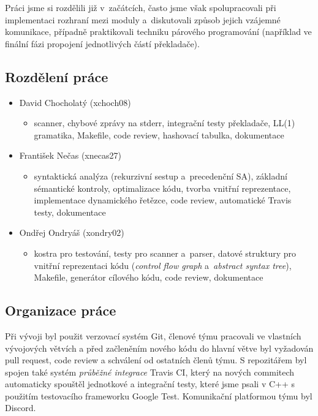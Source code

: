\documentclass[11pt]{article}
\begin{document}
Práci jsme si rozdělili již v~začátcích, často jsme však spolupracovali při implementaci rozhraní mezi moduly a~diskutovali způsob jejich vzájemné komunikace, případně praktikovali techniku párového programování (například ve finální fázi propojení jednotlivých částí překladače).

\subsection{Rozdělení práce}

\begin{itemize}
	\item David Chocholatý (xchoch08)
	    \begin{itemize}
	        \item scanner, chybové zprávy na stderr, integrační testy překladače, LL(1) gramatika, Makefile, code review, hashovací tabulka, dokumentace
	    \end{itemize}
	\item František Nečas (xnecas27) 
	    \begin{itemize}
	        \item syntaktická analýza (rekurzivní sestup a~precedenční SA), základní sémantické kontroly, optimalizace kódu, tvorba vnitřní reprezentace, implementace dynamického řetězce, code review, automatické Travis testy, dokumentace
	    \end{itemize}
	\item Ondřej Ondryáš (xondry02)
	    \begin{itemize}
	        \item kostra pro testování, testy pro scanner a~parser, datové struktury pro vnitřní reprezentaci kódu (\emph{control flow graph} a~\emph{abstract syntax tree}), Makefile, generátor cílového kódu, code review, dokumentace
	    \end{itemize}
\end{itemize}

\subsection{Organizace práce}

Při vývoji byl použit verzovací systém Git, členové týmu pracovali ve vlastních vývojových větvích a před začleněním nového kódu do hlavní větve byl vyžadován pull request, code review a schválení od ostatních členů týmu. S repozitářem byl spojen také systém \emph{průběžné integrace} Travis CI, který na nových commitech automaticky spouštěl jednotkové a integrační testy, které jsme psali v C++ s použitím testovacího frameworku Google Test. Komunikační platformou týmu byl Discord.
\end{document}
